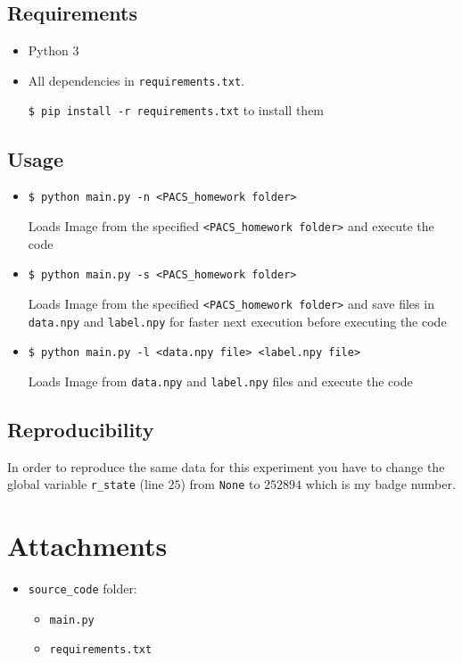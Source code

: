 \documentclass[a4paper, 11pt]{article}
\begin{document}
	\subsection{Requirements}
	\begin{itemize}
		\item Python 3
		\item All dependencies in \texttt{requirements.txt}.
		
		\texttt{\$ pip install -r requirements.txt} to install them
	\end{itemize}
	\subsection{Usage}
	\begin{itemize}
		\item \texttt{\$ python main.py -n <PACS\_homework folder>}
		
		Loads Image from the specified \texttt{<PACS\_homework folder>} and execute the code
		
		\item \texttt{\$ python main.py -s <PACS\_homework folder>}
		
		Loads Image from the specified \texttt{<PACS\_homework folder>} and save files in \texttt{data.npy} and \texttt{label.npy} for faster next execution before executing the code
		
		\item \texttt{\$ python main.py -l <data.npy file> <label.npy file> }
		
		Loads Image from \texttt{data.npy} and \texttt{label.npy} files and execute the code
	
	\end{itemize}
	\subsection{Reproducibility}
	In order to reproduce the same data for this experiment you have to change the global variable \texttt{r\_state} (line $25$) from \texttt{None} to $252894$ which is my badge number.

	\section*{Attachments}
	\begin{itemize}
		\item \texttt{source\_code} folder:
		\begin{itemize}
			\item \texttt{main.py}
			\item \texttt{requirements.txt}
		\end{itemize}
	\end{itemize}
	
\end{document}

